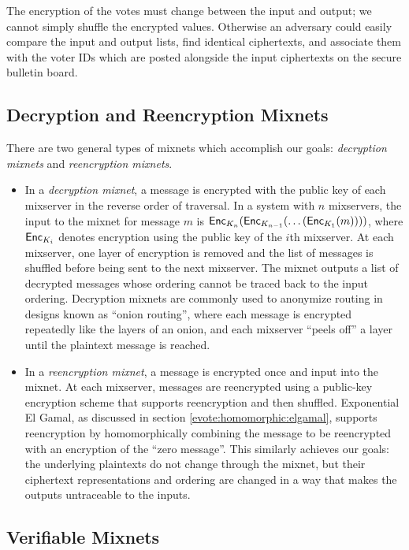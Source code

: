 The encryption of the votes must change between the input and output; we cannot simply shuffle the encrypted values. Otherwise an adversary could easily compare the input and output lists, find identical ciphertexts, and associate them with the voter IDs which are posted alongside the input ciphertexts on the secure bulletin board.

\subsection{Decryption and Reencryption Mixnets} \label{evote:mixnets:types}

There are two general types of mixnets which accomplish our goals: \emph{decryption mixnets} and \emph{reencryption mixnets}.
\begin{itemize}
\item In a \emph{decryption mixnet}, a message is encrypted with the public key of each mixserver in the reverse order of traversal. In a system with $n$ mixservers, the input to the mixnet for message $m$ is $\operatorname{\mathsf{Enc}}_{K_n}(\operatorname{\mathsf{Enc}}_{K_{n-1}}( \dots (\operatorname{\mathsf{Enc}}_{K_1}(m))))$, where $\operatorname{\mathsf{Enc}}_{K_i}$ denotes encryption using the public key of the $i$th mixserver. At each mixserver, one layer of encryption is removed and the list of messages is shuffled before being sent to the next mixserver. The mixnet outputs a list of decrypted messages whose ordering cannot be traced back to the input ordering. Decryption mixnets are commonly used to anonymize routing in designs known as ``onion routing'', where each message is encrypted repeatedly like the layers of an onion, and each mixserver ``peels off'' a layer until the plaintext message is reached.
\item In a \emph{reencryption mixnet}, a message is encrypted once and input into the mixnet. At each mixserver, messages are reencrypted using a public-key encryption scheme that supports reencryption and then shuffled. Exponential El Gamal, as discussed in section \ref{evote:homomorphic:elgamal}, supports reencryption by homomorphically combining the message to be reencrypted with an encryption of the ``zero message''. This similarly achieves our goals: the underlying plaintexts do not change through the mixnet, but their ciphertext representations and ordering are changed in a way that makes the outputs untraceable to the inputs.
\end{itemize}

\subsection{Verifiable Mixnets} \label{evote:mixnets:verifiable}

